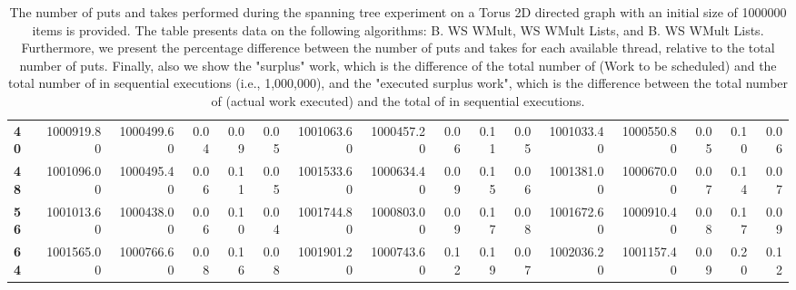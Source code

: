 \begin{table}[!ht]
{\begin{tabular}{lrrrrrrrrrrrrrrr}
\textbf{40} &  1000919.80 & 1000499.60 &           0.04 &        0.09 &                 0.05 &     1001063.60 & 1000457.20 &           0.06 &        0.11 &                 0.05 &        1001033.40 & 1000550.80 &           0.05 &        0.10 &                 0.06 \\
\textbf{48} &  1001096.00 & 1000495.40 &           0.06 &        0.11 &                 0.05 &     1001533.60 & 1000634.40 &           0.09 &        0.15 &                 0.06 &        1001381.00 & 1000670.00 &           0.07 &        0.14 &                 0.07 \\
\textbf{56} &  1001013.60 & 1000438.00 &           0.06 &        0.10 &                 0.04 &     1001744.80 & 1000803.00 &           0.09 &        0.17 &                 0.08 &        1001672.60 & 1000910.40 &           0.08 &        0.17 &                 0.09 \\
\textbf{64} &  1001565.00 & 1000766.60 &           0.08 &        0.16 &                 0.08 &     1001901.20 & 1000743.60 &           0.12 &        0.19 &                 0.07 &        1002036.20 & 1001157.40 &           0.09 &        0.20 &                 0.12 \\
\bottomrule
\end{tabular}}
\label{difference-Torus_2D_directed-1000000-B_WS_NC_MULT_OPT-WS_NC_MULT_LA_OPT-B_WS_NC_MULT_LA_OPT}
\caption{The number of puts and takes performed during the
    spanning tree experiment on a Torus 2D directed graph with an initial size
    of 1000000 items is provided. The table presents data on the
    following algorithms: B. WS WMult, WS WMult Lists, and
    B. WS WMult Lists. Furthermore, we present the percentage difference
    between the number of puts and takes for each available thread,
    relative to the total number of puts. Finally, also we show the
    "surplus" work, which is the difference of the total number of
    \Puts (Work to be scheduled) and the total number of \Puts in
    sequential executions (i.e., 1,000,000), and the "executed surplus
    work", which is the difference between the total number of \Takes
    (actual work executed) and the total of \Takes in sequential
    executions.}
\end{table}
